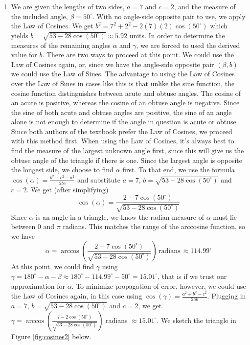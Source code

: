 {\begin{enumerate}
\item  We are given the lengths of two sides, $a=7$ and $c = 2$, and the measure of the included angle, $\beta = 50^{\circ}$.  With no angle-side opposite pair to use, we apply  the Law of Cosines.  We get  $b^2 = 7^2 + 2^2 - 2(7)(2)\cos\left(50^{\circ}\right)$ which yields $b = \sqrt{53-28\cos\left(50^{\circ}\right)} \approx 5.92$ units.  In order to determine the measures of the remaining angles $\alpha$ and $\gamma$, we are forced to used the derived value for $b$. There are two ways to proceed at this point.  We could use the Law of Cosines again, or, since  we have the angle-side opposite pair $(\beta, b)$ we could use the Law of Sines. The advantage to using the Law of Cosines over the Law of Sines in cases like this is that unlike the sine function, the cosine function distinguishes between acute and obtuse angles.  The cosine of an acute is positive, whereas the cosine of an obtuse angle is negative.  Since the sine of both acute and obtuse angles are positive, the sine of an angle alone is not enough to determine if the angle in question is acute or obtuse.  Since both authors of the textbook prefer the Law of Cosines, we proceed with this method first.  When using the Law of Cosines, it's always best to find the measure of the largest unknown angle first, since this will give us the obtuse angle of the triangle if there is one.  Since the largest angle is opposite the longest side, we choose to find $\alpha$ first. To that end, we use the formula $\cos(\alpha) = \frac{b^2+c^2-a^2}{2bc}$ and substitute $a = 7$, $b =  \sqrt{53-28\cos\left(50^{\circ}\right)}$ and $c = 2$. We get (after simplifying) \[\cos(\alpha) = \frac{2-7\cos\left(50^{\circ}\right)}{\sqrt{53-28\cos\left(50^{\circ}\right)}}\]  Since $\alpha$ is an angle in a triangle, we know the radian measure of $\alpha$ must lie between $0$ and $\pi$ radians.  This matches the range of the arccosine function, so we have \[\alpha = \arccos\left(\frac{2-7\cos\left(50^{\circ}\right)}{\sqrt{53-28\cos\left(50^{\circ} \right)}}\right) \, \text{radians} \, \approx  114.99^{\circ}\] At this point, we could find $\gamma$ using $\gamma = 180^{\circ} - \alpha - \beta \approx 180^{\circ} - 114.99^{\circ} - 50^{\circ} = 15.01^{\circ}$, that is if we trust our approximation for $\alpha$. To minimize propagation of error, however, we could use the Law of Cosines again, in this case using $\cos(\gamma) = \frac{a^2+b^2-c^2}{2ab}$.  Plugging in $a = 7$, $b = \sqrt{53-28\cos\left(50^{\circ} \right)}$ and $c=2$, we get  $\gamma = \arccos\left(\frac{7-2 \cos\left(50^{\circ}\right)}{\sqrt{53-28\cos\left(50^{\circ} \right)}} \right)$ radians $\approx 15.01^{\circ}$.  We sketch the triangle in Figure \ref{fig:cosines2} below.


\end{enumerate}}
